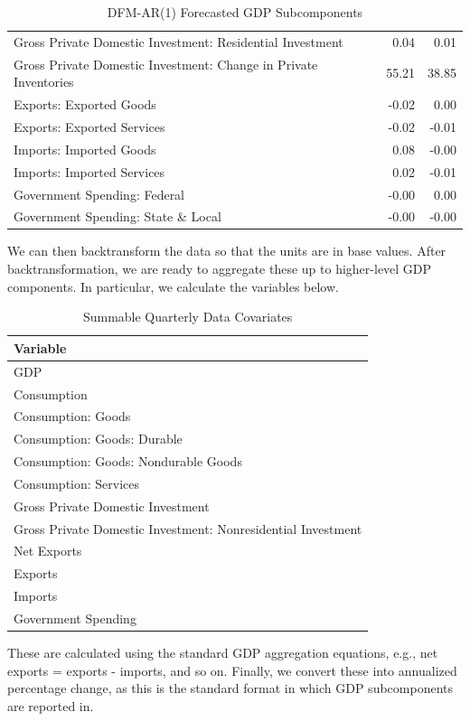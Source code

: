 \documentclass[11pt, letterpaper]{article}\usepackage[]{graphicx}\usepackage[]{color}
\begin{document}
\begin{table}[H]
\begin{tabular}{lrr}
  Gross Private Domestic Investment: Residential Investment & 0.04 & 0.01 \\ 
  Gross Private Domestic Investment: Change in Private Inventories & 55.21 & 38.85 \\ 
  Exports: Exported Goods & -0.02 & 0.00 \\ 
  Exports: Exported Services & -0.02 & -0.01 \\ 
  Imports: Imported Goods & 0.08 & -0.00 \\ 
  Imports: Imported Services & 0.02 & -0.01 \\ 
  Government Spending: Federal & -0.00 & 0.00 \\ 
  Government Spending: State \& Local & -0.00 & -0.00 \\ 
   \hline
\end{tabular}
\endgroup
\caption{DFM-AR(1) Forecasted GDP Subcomponents} 
\end{table}


We can then backtransform the data so that the units are in base values. After backtransformation, we are ready to aggregate these up to higher-level GDP components. In particular, we calculate the variables below.
\begin{table}[H]
\centering
\begingroup\scriptsize
\begin{tabular}{l}
  \hline
Variable \\ 
  \hline
GDP \\ 
  Consumption \\ 
  Consumption: Goods \\ 
  Consumption: Goods: Durable \\ 
  Consumption: Goods: Nondurable Goods \\ 
  Consumption: Services \\ 
  Gross Private Domestic Investment \\ 
  Gross Private Domestic Investment: Nonresidential Investment \\ 
  Net Exports \\ 
  Exports \\ 
  Imports \\ 
  Government Spending \\ 
   \hline
\end{tabular}
\endgroup
\caption{Summable Quarterly Data Covariates} 
\end{table}

These are calculated using the standard GDP aggregation equations, e.g., net exports = exports - imports, and so on.
Finally, we convert these into annualized percentage change, as this is the standard format in which GDP subcomponents are reported in.
\end{document}
